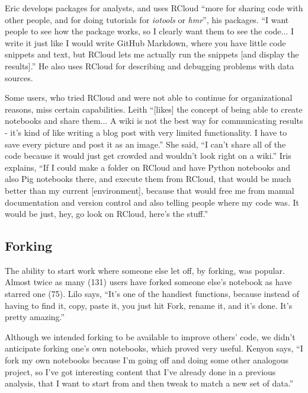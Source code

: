 Eric develops packages for analysts, and uses RCloud ``more for sharing code with
other people, and for doing tutorials for {\em iotools} or {\em hmr}'', his packages.
``I want people to see how the package works, so I clearly want them
to see the code... I write it just like I would write GitHub
Markdown, where you have little code snippets and text, but RCloud lets me
actually run the snippets [and display the results].'' He also uses RCloud for
describing and debugging problems with data sources.

Some users, who tried RCloud and were not able to continue for organizational
reasons, miss certain capabilities. Leith ``[likes] the concept of being
able to create notebooks and share them... A wiki is not the best way for
communicating results - it's kind of like writing a blog post with very limited
functionality. I have to save every picture and post it as an image.'' She said,
``I can't share all of the code because it would just get crowded and wouldn't
look right on a wiki.'' Iris explains, ``If I could make a folder on RCloud and
have Python notebooks and also Pig notebooks there, and execute them from RCloud,
that would be much better than my current [environment], because that would free
me from manual documentation and version control and also telling people where
my code was. It would be just, hey, go look on RCloud, here's the stuff.''



\subsection{Forking}
The ability to start work where someone else let off, by forking, was popular.
Almost twice as many (131) users have forked
someone else's notebook as have starred one (75). Lilo says, ``It's one of the
handiest functions, because instead of having to find it, copy, paste it, you
just hit Fork, rename it, and it's done. It's pretty amazing.''

Although we intended forking to be available to improve others' code, we 
didn't anticipate forking one's own notebooks, which
proved very useful. Kenyon says, ``I fork my own notebooks because I'm going off
and doing some other analogous project, so I've got interesting content that I've
already done in a previous analysis, that I want to start from and then tweak
to match a new set of data.''

